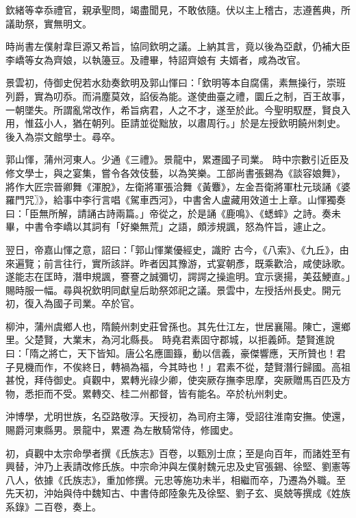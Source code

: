 \begin{pinyinscope}
 欽緒等幸忝禮官，親承聖問，竭盡聞見，不敢依隨。伏以主上稽古，志遵舊典，所議助祭，實無明文。



 時尚書左僕射韋巨源又希旨，協同欽明之議。上納其言，竟以後為亞獻，仍補大臣李嶠等女為齊娘，以執籩豆。及禮畢，特詔齊娘有
 夫婿者，咸為改官。



 景雲初，侍御史倪若水劾奏欽明及郭山惲曰：「欽明等本自腐儒，素無操行，崇班列爵，實為叨忝。而涓塵莫效，諂佞為能。遂使曲臺之禮，圜丘之制，百王故事，一朝墜失。所謂亂常改作，希旨病君，人之不才，遂至於此。今聖明馭歷，賢良入用，惟茲小人，猶在朝列。臣請並從黜放，以肅周行。」於是左授欽明饒州刺史。後入為崇文館學士。尋卒。



 郭山惲，蒲州河東人。少通《三禮》。景龍中，累遷國子司業。
 時中宗數引近臣及修文學士，與之宴集，嘗令各效伎藝，以為笑樂。工部尚書張錫為《談容娘舞》，將作大匠宗晉卿舞《渾脫》，左衛將軍張洽舞《黃麞》，左金吾衛將軍杜元琰誦《婆羅門咒〗》，給事中李行言唱《駕車西河》，中書舍人盧藏用效道士上章。山惲獨奏曰：「臣無所解，請誦古詩兩篇。」帝從之，於是誦《鹿鳴》、《蟋蟀》之詩。奏未畢，中書令李嶠以其詞有「好樂無荒」之語，頗涉規諷，怒為忤旨，遽止之。



 翌日，帝嘉山惲之意，詔曰：「郭山惲業優經史，識貯
 古今，《八索》、《九丘》，由來遍覽；前言往行，實所該詳。昨者因其豫游，式宴朝彥，既乘歡洽，咸使詠歌。遂能志在匡時，潛申規諷，謇謇之誠彌切，諤諤之操逾明。宜示褒揚，美茲鯁直。」賜時服一幅。尋與祝欽明同獻皇后助祭郊祀之議。景雲中，左授括州長史。開元初，復入為國子司業。卒於官。



 柳沖，蒲州虞鄉人也，隋饒州刺史莊曾孫也。其先仕江左，世居襄陽。陳亡，還鄉里。父楚賢，大業末，為河北縣長。
 時堯君素固守郡城，以拒義師。楚賢進說曰：「隋之將亡，天下皆知。唐公名應圖籙，動以信義，豪傑響應，天所贊也！君子見機而作，不俟終日，轉禍為福，今其時也！」君素不從，楚賢潛行歸國。高祖甚悅，拜侍御史。貞觀中，累轉光祿少卿，使突厥存撫李思摩，突厥贈馬百匹及方物，悉拒而不受。累轉交、桂二州都督，皆有能名。卒於杭州刺史。



 沖博學，尤明世族，名亞路敬淳。天授初，為司府主簿，受詔往淮南安撫。使還，賜爵河東縣男。景龍中，累遷
 為左散騎常侍，修國史。



 初，貞觀中太宗命學者撰《氏族志》百卷，以甄別士庶；至是向百年，而諸姓至有興替，沖乃上表請改修氏族。中宗命沖與左僕射魏元忠及史官張錫、徐堅、劉憲等八人，依據《氏族志》，重加修撰。元忠等施功未半，相繼而卒，乃遷為外職。至先天初，沖始與侍中魏知古、中書侍郎陸象先及徐堅、劉子玄、吳兢等撰成《姓族系錄》二百卷，奏上。




\end{pinyinscope}
